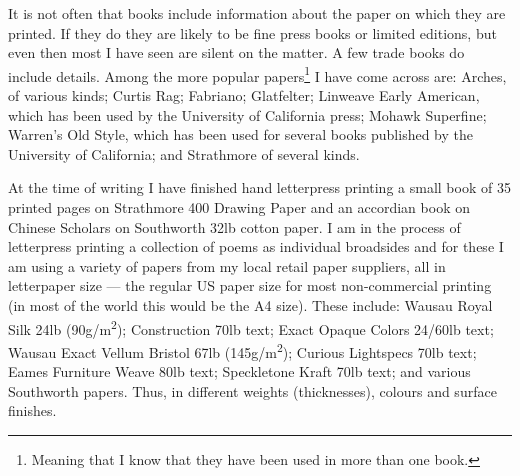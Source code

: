 \documentclass[10pt,a4paper,extrafontsizes]{memoir}
\newcommand*{\sqrd}[1]{#1\textsuperscript{2}}
\newcommand*{\gsm}{g/\sqrd{m}}
\begin{document}

\begin{paracol}{2}
\switchEng
    It is not often that books include information about the paper on which
they are printed. If they do they are likely to be fine press books or 
limited editions, but even then most I have seen are silent on the matter. 
A few trade books do include details. Among the more popular 
papers\footnote{Meaning that I know that they have been used in more than
one book.} I have
come across are: 
Arches, of various kinds; 
Curtis Rag;
Fabriano;
Glatfelter;
Linweave Early American, which
has been used by the University of California press;
Mohawk Superfine;
Warren's Old Style, which has been used for 
several books published by the University of California; and 
Strathmore of several kinds.

   At the time of writing I have finished hand letterpress printing a 
small book of 35 printed pages on Strathmore 400 Drawing Paper and an 
accordian book on Chinese Scholars on Southworth 
32lb cotton paper. I am in the process of letterpress printing a collection
of poems as individual broadsides and for these I am using a variety of
papers from my local retail paper suppliers, all in letterpaper size ---
the regular US paper size for most non-commercial printing (in most of the 
world this would be the A4 size). These include: Wausau Royal Silk 24lb
(90\gsm);
Construction 70lb text; Exact Opaque Colors 24/60lb text; Wausau Exact 
Vellum Bristol 67lb (145\gsm); Curious Lightspecs 70lb text; Eames Furniture
Weave 80lb text; Speckletone Kraft 70lb text; and various Southworth papers. 
Thus, in different weights (thicknesses), colours and surface finishes.
\end{paracol}
\end{document}

